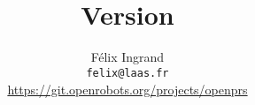 \documentclass[twoside,openright]{book}
\begin{document}
\title{
        \COPRSDE{} \\
         Version \oprsdocversion{}}

\author{F\'{e}lix Ingrand\\
        \texttt{felix@laas.fr}\\
        \url{https://git.openrobots.org/projects/openprs}
}

\maketitle

\clearpage


\clearpage
\pagestyle{headings}

\tableofcontents
\listoffigures
\listoftables

\cleardoublepage
{}













\end{document}
